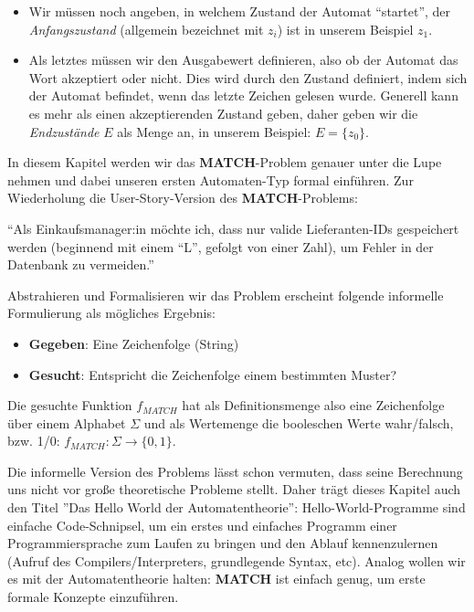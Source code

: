 \begin{itemize}
    \item Wir müssen noch angeben, in welchem Zustand der Automat ``startet'',
        der \emph{Anfangszustand} (allgemein bezeichnet mit $z_i$)
        ist in unserem Beispiel $z_1$.

    \item Als letztes müssen wir den Ausgabewert definieren,
        also ob der Automat das Wort akzeptiert oder nicht.
        Dies wird durch den Zustand definiert, indem sich der Automat
        befindet, wenn das letzte Zeichen gelesen wurde.
        Generell kann es mehr als einen akzeptierenden Zustand geben,
        daher geben wir die \emph{Endzustände} $E$ als Menge an,
        in unserem Beispiel: $E = \{z_0\}$.
\end{itemize}



In diesem Kapitel werden wir das \textbf{MATCH}-Problem genauer unter die Lupe nehmen
und dabei unseren ersten Automaten-Typ formal einführen.
Zur Wiederholung die User-Story-Version des \textbf{MATCH}-Problems:
\begin{center}
``Als Einkaufsmanager:in möchte ich, dass nur valide Lieferanten-IDs gespeichert werden
(beginnend mit einem ``L'', gefolgt von einer Zahl),
um Fehler in der Datenbank zu vermeiden.''
\end{center}
Abstrahieren und Formalisieren wir das Problem erscheint folgende informelle Formulierung
als mögliches Ergebnis:
\begin{itemize}
\item \textbf{Gegeben}: Eine Zeichenfolge (String)
\item \textbf{Gesucht}: Entspricht die Zeichenfolge einem bestimmten Muster?
\end{itemize}
Die gesuchte Funktion $f_{MATCH}$ hat als Definitionsmenge also eine Zeichenfolge
über einem Alphabet $\Sigma$ und als Wertemenge die booleschen Werte wahr/falsch,
bzw. 1/0: $f_{MATCH}: \Sigma \rightarrow \{0,1\}$.

Die informelle Version des Problems lässt schon vermuten,
dass seine Berechnung uns nicht vor große theoretische Probleme stellt.
Daher trägt dieses Kapitel auch den Titel ''Das Hello World der Automatentheorie'':
Hello-World-Programme sind einfache Code-Schnipsel,
um ein erstes und einfaches Programm einer Programmiersprache zum Laufen zu bringen
und den Ablauf kennenzulernen (Aufruf des Compilers/Interpreters, grundlegende Syntax, etc).
Analog wollen wir es mit der Automatentheorie halten:
\textbf{MATCH} ist einfach genug, um erste formale Konzepte einzuführen.



